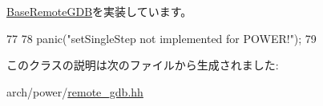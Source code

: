 \hyperlink{classBaseRemoteGDB_a253d4b1107e84fe80036d1826067741a}{BaseRemoteGDB}を実装しています。


\begin{DoxyCode}
77     {
78         panic("setSingleStep not implemented for POWER!");
79     }
\end{DoxyCode}


このクラスの説明は次のファイルから生成されました:\begin{DoxyCompactItemize}
\item 
arch/power/\hyperlink{arch_2power_2remote__gdb_8hh}{remote\_\-gdb.hh}\end{DoxyCompactItemize}

